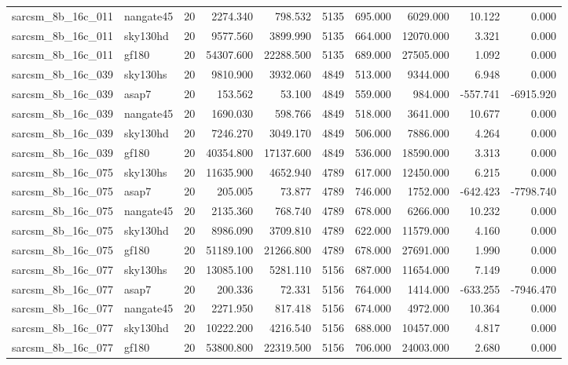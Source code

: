 \begin{longtable}{llrrrrrrrr}
sarcsm\_8b\_16c\_011 & nangate45 & 20 & 2274.340 & 798.532 & 5135 & 695.000 & 6029.000 & 10.122 & 0.000 \\
sarcsm\_8b\_16c\_011 & sky130hd & 20 & 9577.560 & 3899.990 & 5135 & 664.000 & 12070.000 & 3.321 & 0.000 \\
sarcsm\_8b\_16c\_011 & gf180 & 20 & 54307.600 & 22288.500 & 5135 & 689.000 & 27505.000 & 1.092 & 0.000 \\
sarcsm\_8b\_16c\_039 & sky130hs & 20 & 9810.900 & 3932.060 & 4849 & 513.000 & 9344.000 & 6.948 & 0.000 \\
sarcsm\_8b\_16c\_039 & asap7 & 20 & 153.562 & 53.100 & 4849 & 559.000 & 984.000 & -557.741 & -6915.920 \\
sarcsm\_8b\_16c\_039 & nangate45 & 20 & 1690.030 & 598.766 & 4849 & 518.000 & 3641.000 & 10.677 & 0.000 \\
sarcsm\_8b\_16c\_039 & sky130hd & 20 & 7246.270 & 3049.170 & 4849 & 506.000 & 7886.000 & 4.264 & 0.000 \\
sarcsm\_8b\_16c\_039 & gf180 & 20 & 40354.800 & 17137.600 & 4849 & 536.000 & 18590.000 & 3.313 & 0.000 \\
sarcsm\_8b\_16c\_075 & sky130hs & 20 & 11635.900 & 4652.940 & 4789 & 617.000 & 12450.000 & 6.215 & 0.000 \\
sarcsm\_8b\_16c\_075 & asap7 & 20 & 205.005 & 73.877 & 4789 & 746.000 & 1752.000 & -642.423 & -7798.740 \\
sarcsm\_8b\_16c\_075 & nangate45 & 20 & 2135.360 & 768.740 & 4789 & 678.000 & 6266.000 & 10.232 & 0.000 \\
sarcsm\_8b\_16c\_075 & sky130hd & 20 & 8986.090 & 3709.810 & 4789 & 622.000 & 11579.000 & 4.160 & 0.000 \\
sarcsm\_8b\_16c\_075 & gf180 & 20 & 51189.100 & 21266.800 & 4789 & 678.000 & 27691.000 & 1.990 & 0.000 \\
sarcsm\_8b\_16c\_077 & sky130hs & 20 & 13085.100 & 5281.110 & 5156 & 687.000 & 11654.000 & 7.149 & 0.000 \\
sarcsm\_8b\_16c\_077 & asap7 & 20 & 200.336 & 72.331 & 5156 & 764.000 & 1414.000 & -633.255 & -7946.470 \\
sarcsm\_8b\_16c\_077 & nangate45 & 20 & 2271.950 & 817.418 & 5156 & 674.000 & 4972.000 & 10.364 & 0.000 \\
sarcsm\_8b\_16c\_077 & sky130hd & 20 & 10222.200 & 4216.540 & 5156 & 688.000 & 10457.000 & 4.817 & 0.000 \\
sarcsm\_8b\_16c\_077 & gf180 & 20 & 53800.800 & 22319.500 & 5156 & 706.000 & 24003.000 & 2.680 & 0.000 \\

\end{longtable}
